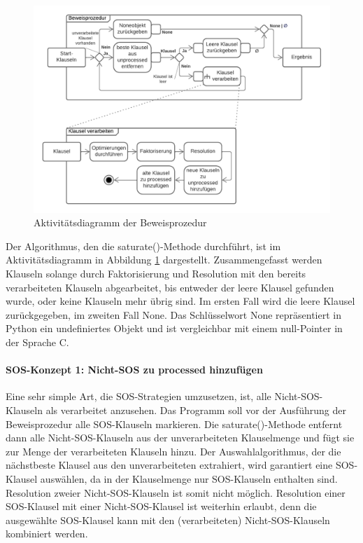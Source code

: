 \begin{figure}
	\centering
	\includegraphics[width=1\linewidth]{images/Lucid/ActivityProof}
	\caption{Aktivitätsdiagramm der Beweisprozedur}
	\label{fig:activityproof}
\end{figure}


Der Algorithmus, den die saturate()-Methode durchführt, ist im Aktivitätsdiagramm in Abbildung \ref{fig:activityproof} dargestellt. Zusammengefasst werden Klauseln solange durch Faktorisierung und Resolution mit den bereits verarbeiteten Klauseln abgearbeitet, bis entweder der leere Klausel gefunden wurde, oder keine Klauseln mehr übrig sind.
Im ersten Fall wird die leere Klausel zurückgegeben, im zweiten Fall None. Das Schlüsselwort None repräsentiert in Python ein undefiniertes Objekt und ist vergleichbar mit einem null-Pointer in der Sprache C.

\paragraph{SOS-Konzept 1: Nicht-SOS zu processed hinzufügen}

Eine sehr simple Art, die SOS-Strategien umzusetzen, ist, alle Nicht-SOS-Klauseln als verarbeitet anzusehen. Das Programm soll vor der Ausführung der Beweisprozedur alle SOS-Klauseln markieren. Die saturate()-Methode entfernt dann alle Nicht-SOS-Klauseln aus der unverarbeiteten Klauselmenge und fügt sie zur Menge der verarbeiteten Klauseln hinzu. Der Auswahlalgorithmus, der die nächstbeste Klausel aus den unverarbeiteten extrahiert, wird garantiert eine SOS-Klausel auswählen, da in der Klauselmenge nur SOS-Klauseln enthalten sind. Resolution zweier Nicht-SOS-Klauseln ist somit nicht möglich. Resolution einer SOS-Klausel mit einer Nicht-SOS-Klausel ist weiterhin erlaubt, denn die ausgewählte SOS-Klausel kann mit den (verarbeiteten) Nicht-SOS-Klauseln kombiniert werden. 

